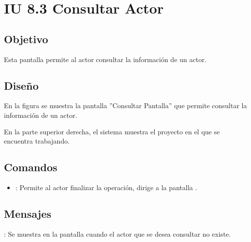 \section{IU 8.3 Consultar Actor}

\subsection{Objetivo}
	Esta pantalla permite al actor consultar la información de un actor.
\subsection{Diseño}
	En la figura  se muestra la pantalla ''Consultar Pantalla'' que permite consultar la información de un actor.
	
	En la parte superior derecha, el sistema muestra el proyecto en el que se encuentra trabajando.

\subsection{Comandos}
\begin{itemize}
	\item {}: Permite al actor finalizar la operación, dirige a la pantalla .
\end{itemize}

\subsection{Mensajes}

\begin{Citemize}
	\item {}: Se muestra en la pantalla  cuando el actor que se desea consultar no existe.
\end{Citemize}
